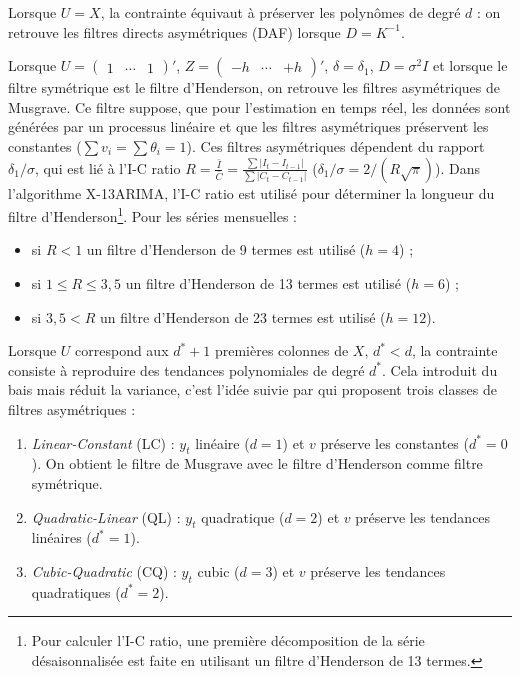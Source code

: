 \documentclass[
  11pt,
  french,
  a4paper]{article}
\newcommand\1{\mathds{1}}
\begin{document}
Lorsque \(U=X\), la contrainte équivaut à préserver les polynômes de degré \(d\) : on retrouve les filtres directs asymétriques (DAF) lorsque \(D=K^{-1}\).

Lorsque \(U=\begin{pmatrix}1&\cdots&1\end{pmatrix}'\), \(Z=\begin{pmatrix}-h&\cdots&+h\end{pmatrix}'\), \(\delta=\delta_1\), \(D=\sigma^2I\) et lorsque le filtre symétrique est le filtre d'Henderson, on retrouve les filtres asymétriques de Musgrave.
Ce filtre suppose, que pour l'estimation en temps réel, les données sont générées par un processus linéaire et que les filtres asymétriques préservent les constantes (\(\sum v_i=\sum \theta_i=1\)).
Ces filtres asymétriques dépendent du rapport \(\delta_1/\sigma\), qui est lié à l'I-C ratio \(R=\frac{\bar{I}}{\bar{C}}=\frac{\sum\lvert I_t-I_{t-1}\rvert}{\sum\lvert C_t-C_{t-1}\rvert}\) (\(\delta_1/\sigma=2/(R\sqrt{\pi})\)).
Dans l'algorithme X-13ARIMA, l'I-C ratio est utilisé pour déterminer la longueur du filtre d'Henderson\footnote{
  Pour calculer l'I-C ratio, une première décomposition de la série désaisonnalisée est faite en utilisant un filtre d'Henderson de 13 termes.}.
Pour les séries mensuelles :

\begin{itemize}
\item
  si \(R<1\) un filtre d'Henderson de 9 termes est utilisé (\(h=4\)) ;
\item
  si \(1\leq R\leq3,5\) un filtre d'Henderson de 13 termes est utilisé (\(h=6\)) ;
\item
  si \(3,5< R\) un filtre d'Henderson de 23 termes est utilisé (\(h=12\)).
\end{itemize}

Lorsque \(U\) correspond aux \(d^*+1\) premières colonnes de \(X\), \(d^*<d\), la contrainte consiste à reproduire des tendances polynomiales de degré \(d^*\).
Cela introduit du bais mais réduit la variance, c'est l'idée suivie par \textcite{proietti2008} qui proposent trois classes de filtres asymétriques :

\begin{enumerate}
\def\labelenumi{\arabic{enumi}.}
\item
  \emph{Linear-Constant} (LC) : \(y_t\) linéaire (\(d=1\)) et \(v\) préserve les constantes (\(d^*=0\)).
  On obtient le filtre de Musgrave avec le filtre d'Henderson comme filtre symétrique.
\item
  \emph{Quadratic-Linear} (QL) : \(y_t\) quadratique (\(d=2\)) et \(v\) préserve les tendances linéaires (\(d^*=1\)).
\item
  \emph{Cubic-Quadratic} (CQ) : \(y_t\) cubic (\(d=3\)) et \(v\) préserve les tendances quadratiques (\(d^*=2\)).
\end{enumerate}
\end{document}
